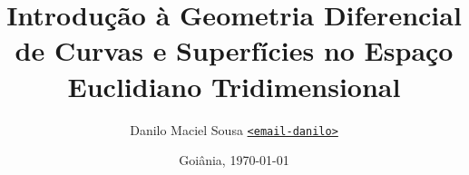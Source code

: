 \title{Introdução à Geometria Diferencial de Curvas e Superfícies no Espaço Euclidiano Tridimensional}
\author{Danilo Maciel Sousa \href{mailto:<email-danilo>}{\small{\texttt{<email-danilo>}}}}
\date{Goiânia, \today}
